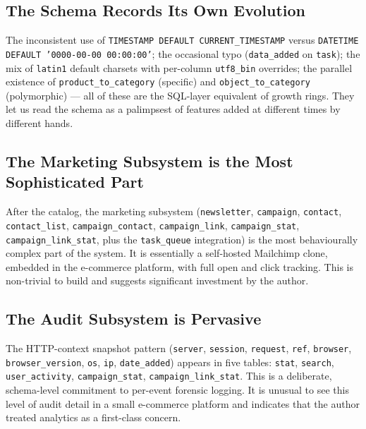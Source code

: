 \documentclass[11pt,a4paper]{article}
\begin{document}
\subsection{The Schema Records Its Own Evolution}

The inconsistent use of \texttt{TIMESTAMP DEFAULT CURRENT\_TIMESTAMP}
versus \texttt{DATETIME DEFAULT '0000-00-00 00:00:00'}; the
occasional typo (\texttt{data\_added} on \texttt{task}); the
mix of \texttt{latin1} default charsets with per-column
\texttt{utf8\_bin} overrides; the parallel existence of
\texttt{product\_to\_category} (specific) and
\texttt{object\_to\_category} (polymorphic) --- all of these
are the SQL-layer equivalent of growth rings. They let us
read the schema as a palimpsest of features added at different
times by different hands.

\subsection{The Marketing Subsystem is the Most Sophisticated Part}

After the catalog, the marketing subsystem
(\texttt{newsletter}, \texttt{campaign}, \texttt{contact},
\texttt{contact\_list}, \texttt{campaign\_contact},
\texttt{campaign\_link}, \texttt{campaign\_stat},
\texttt{campaign\_link\_stat}, plus the \texttt{task\_queue}
integration) is the most behaviourally complex part of the
system. It is essentially a self-hosted Mailchimp clone,
embedded in the e-commerce platform, with full open and
click tracking. This is non-trivial to build and suggests
significant investment by the author.

\subsection{The Audit Subsystem is Pervasive}

The HTTP-context snapshot pattern (\texttt{server},
\texttt{session}, \texttt{request}, \texttt{ref},
\texttt{browser}, \texttt{browser\_version}, \texttt{os},
\texttt{ip}, \texttt{date\_added}) appears in five tables:
\texttt{stat}, \texttt{search}, \texttt{user\_activity},
\texttt{campaign\_stat}, \texttt{campaign\_link\_stat}. This
is a deliberate, schema-level commitment to per-event
forensic logging. It is unusual to see this level of audit
detail in a small e-commerce platform and indicates that the
author treated analytics as a first-class concern.

\end{document}
